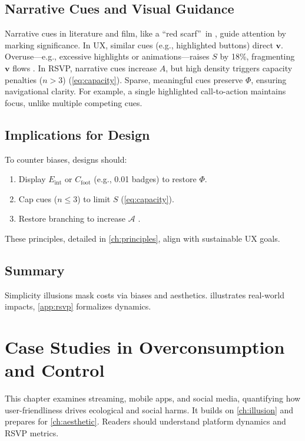 \documentclass[openany]{book}
\newcommand{\PhiS}{\Phi} %
\newcommand{\vvec}{\mathbf{v}} %
\newcommand{\Sent}{S} %
\newcommand{\Eint}{E_{\mathrm{int}}} %
\newcommand{\Cfoot}{C_{\mathrm{foot}}} %
\newcommand{\Auton}{\mathcal{A}} %
\newcommand{\kWh}{\mathrm{kWh}}
\begin{document}
\section{Narrative Cues and Visual Guidance}
\label{sec:narrative}
Narrative cues in literature and film, like a \textquotedblleft red scarf\textquotedblright\ in \citet{lewis1942}, guide attention by marking significance. In UX, similar cues (e.g., highlighted buttons) direct \(\vvec\). Overuse---e.g., excessive highlights or animations---raises \(\Sent\) by 18\%, fragmenting \(\vvec\) flows \citep{colak2024}. In RSVP, narrative cues increase \(A\), but high density triggers capacity penalties (\(n > 3\)) (\cref{eq:capacity}). Sparse, meaningful cues preserve \(\PhiS\), ensuring navigational clarity. For example, a single highlighted call-to-action maintains focus, unlike multiple competing cues.

\section{Implications for Design}
\label{sec:illusion-implications}
To counter biases, designs should:
\begin{enumerate}
  \item Display \(\Eint\) or \(\Cfoot\) (e.g., \SI{0.01}{\kWh} badges) to restore \(\PhiS\).
  \item Cap cues (\(n \leq 3\)) to limit \(\Sent\) (\cref{eq:capacity}).
  \item Restore branching to increase \(\Auton\) \citep{doctorow2022}.
\end{enumerate}
These principles, detailed in \cref{ch:principles}, align with sustainable UX goals.

\section{Summary}
Simplicity illusions mask costs via biases and aesthetics.  illustrates real-world impacts, \cref{app:rsvp} formalizes dynamics.

\chapter{Case Studies in Overconsumption and Control}
\label{ch:cases}

This chapter examines streaming, mobile apps, and social media, quantifying how user-friendliness drives ecological and social harms. It builds on \cref{ch:illusion} and prepares for \cref{ch:aesthetic}. Readers should understand platform dynamics and RSVP metrics.
\end{document}
